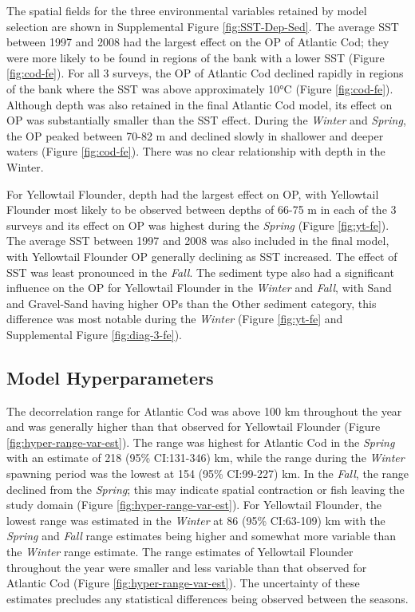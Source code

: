 \documentclass[
]{article}
\begin{document}
The spatial fields for the three environmental variables retained by model selection are shown in Supplemental Figure \ref{fig:SST-Dep-Sed}. The average SST between 1997 and 2008 had the largest effect on the OP of Atlantic Cod; they were more likely to be found in regions of the bank with a lower SST (Figure \ref{fig:cod-fe}). For all 3 surveys, the OP of Atlantic Cod declined rapidly in regions of the bank where the SST was above approximately 10°C (Figure \ref{fig:cod-fe}). Although depth was also retained in the final Atlantic Cod model, its effect on OP was substantially smaller than the SST effect. During the \emph{Winter} and \emph{Spring}, the OP peaked between 70-82 m and declined slowly in shallower and deeper waters (Figure \ref{fig:cod-fe}). There was no clear relationship with depth in the Winter.

For Yellowtail Flounder, depth had the largest effect on OP, with Yellowtail Flounder most likely to be observed between depths of 66-75 m in each of the 3 surveys and its effect on OP was highest during the \emph{Spring} (Figure \ref{fig:yt-fe}). The average SST between 1997 and 2008 was also included in the final model, with Yellowtail Flounder OP generally declining as SST increased. The effect of SST was least pronounced in the \emph{Fall}. The sediment type also had a significant influence on the OP for Yellowtail Flounder in the \emph{Winter} and \emph{Fall}, with Sand and Gravel-Sand having higher OPs than the Other sediment category, this difference was most notable during the \emph{Winter} (Figure \ref{fig:yt-fe} and Supplemental Figure \ref{fig:diag-3-fe}).

\hypertarget{model-hyperparameters}{%
\subsection{Model Hyperparameters}\label{model-hyperparameters}}

The decorrelation range for Atlantic Cod was above 100 km throughout the year and was generally higher than that observed for Yellowtail Flounder (Figure \ref{fig:hyper-range-var-est}). The range was highest for Atlantic Cod in the \emph{Spring} with an estimate of 218 (95\% CI:131-346) km, while the range during the \emph{Winter} spawning period was the lowest at 154 (95\% CI:99-227) km. In the \emph{Fall}, the range declined from the \emph{Spring}; this may indicate spatial contraction or fish leaving the study domain (Figure \ref{fig:hyper-range-var-est}). For Yellowtail Flounder, the lowest range was estimated in the \emph{Winter} at 86 (95\% CI:63-109) km with the \emph{Spring} and \emph{Fall} range estimates being higher and somewhat more variable than the \emph{Winter} range estimate. The range estimates of Yellowtail Flounder throughout the year were smaller and less variable than that observed for Atlantic Cod (Figure \ref{fig:hyper-range-var-est}). The uncertainty of these estimates precludes any statistical differences being observed between the seasons.
\end{document}
